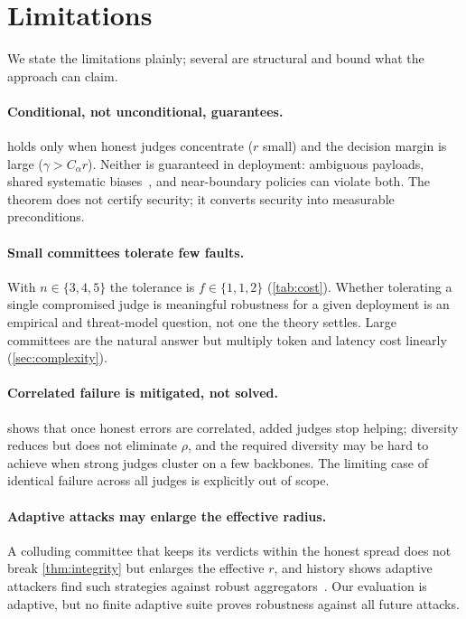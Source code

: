 \section{Limitations}
\label{sec:limitations}

We state the limitations plainly; several are structural and bound what the approach can
claim.

\paragraph{Conditional, not unconditional, guarantees.}
 holds only when honest judges concentrate ($r$ small) and the decision
margin is large ($\gamma>C_\alpha r$). Neither is guaranteed in deployment: ambiguous
payloads, shared systematic biases~\cite{zheng2023judging,wang2023notfair}, and
near-boundary policies can violate both. The theorem does not certify security; it converts
security into measurable preconditions.

\paragraph{Small committees tolerate few faults.}
With $n\in\{3,4,5\}$ the tolerance is $f\in\{1,1,2\}$ (\cref{tab:cost}). Whether tolerating
a single compromised judge is meaningful robustness for a given deployment is an empirical
and threat-model question, not one the theory settles. Large committees are the natural
answer but multiply token and latency cost linearly (\cref{sec:complexity}).

\paragraph{Correlated failure is mitigated, not solved.}
 shows that once honest errors are correlated, added judges stop
helping; diversity reduces but does not eliminate $\rho$, and the required diversity may be
hard to achieve when strong judges cluster on a few backbones. The limiting case of
identical failure across all judges is explicitly out of scope.

\paragraph{Adaptive attacks may enlarge the effective radius.}
A colluding committee that keeps its verdicts within the honest spread does not break
\cref{thm:integrity} but enlarges the effective $r$, and history shows adaptive attackers
find such
strategies against robust aggregators~\cite{baruch2019little,fang2020poisoning,xie2019fall}.
Our evaluation is adaptive, but no finite adaptive suite proves robustness against all
future attacks.

